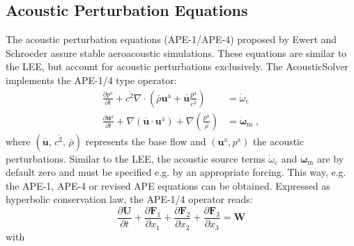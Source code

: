 \subsection{Acoustic Perturbation Equations}
The acoustic perturbation equations (APE-1/APE-4) proposed by Ewert and Schroeder \cite{EwSc03} assure stable aeroacoustic simulations.
These equations are similar to the LEE, but account for acoustic perturbations exclusively.
The AcousticSolver implements the APE-1/4 type operator:
\begin{subequations}
    \begin{align}
        \frac{\partial p^{\mathrm{a}}}{\partial t} 
        + \overline{c^2} \nabla \cdot \left( \overline{\rho}
        \boldsymbol{u}^{\mathrm{a}} 
        + \overline{\boldsymbol{u}} \frac{p^{\mathrm{a}}}{\overline{c^2}} \right) 
        &= \dot{\omega}_{\mathrm{c}}
        \\
        \frac{\partial \boldsymbol{u}^{\mathrm{a}}}{\partial t} 
        + \nabla \left(\overline{\boldsymbol{u}} \cdot
        \boldsymbol{u}^{\mathrm{a}} \right) 
        + \nabla \left(\frac{p^{\mathrm{a}}}{\overline{\rho}}\right) 
        &= \dot{\boldsymbol{\omega}}_{\mathrm{m}}
        \;,
    \end{align}
\end{subequations}
where $(\overline{\boldsymbol{u}},\,\overline{c^2},\, \overline{\rho})$
represents the base flow and $(\boldsymbol{u}^{\mathrm{a}},p^{\mathrm{a}})$ the acoustic perturbations.
Similar to the LEE, the acoustic source terms $\dot{\omega}_{\mathrm{c}}$ and
$\dot{\boldsymbol{\omega}}_{\mathrm{m}}$ are by default zero and must be specified e.g. by an appropriate forcing.
This way, e.g. the APE-1, APE-4 \cite{EwSc03} or revised APE equations \cite{Ge14} can be obtained.
Expressed as hyperbolic conservation law, the APE-1/4 operator reads:
\begin{equation}
\frac{\partial  \boldsymbol{U}}{\partial t}
+ \frac{\partial \boldsymbol{F}_1}{\partial x_1}
+ \frac{\partial \boldsymbol{F}_2}{\partial x_2}
+ \frac{\partial \boldsymbol{F}_3}{\partial x_3}
= \boldsymbol{W}
\end{equation}
with
